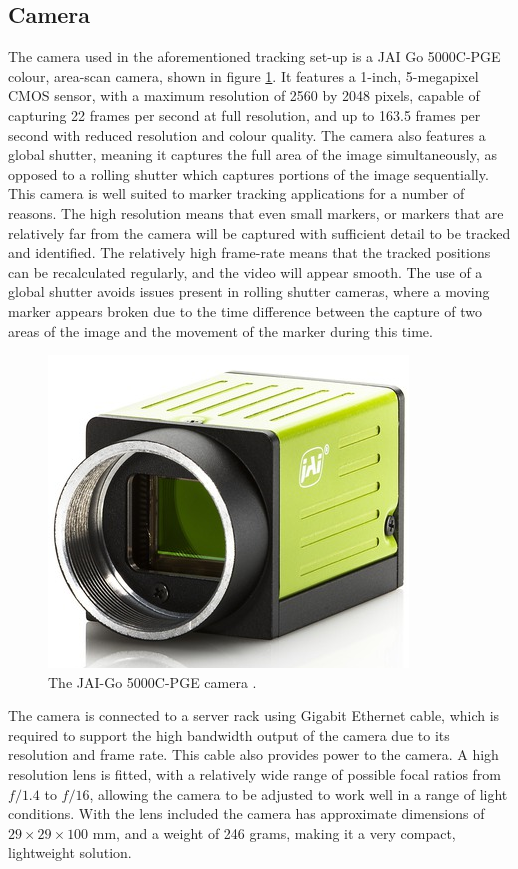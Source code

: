 \subsection{Camera}
The camera used in the aforementioned tracking set-up is a JAI Go 5000C-PGE colour, area-scan camera, shown in figure \ref{fig:Camera}. It features a 1-inch, 5-megapixel CMOS sensor, with a maximum resolution of 2560 by 2048 pixels, capable of capturing 22 frames per second at full resolution, and up to 163.5 frames per second with reduced resolution and colour quality. The camera also features a global shutter, meaning it captures the full area of the image simultaneously, as opposed to a rolling shutter which captures portions of the image sequentially. This camera is well suited to marker tracking applications for a number of reasons. The high resolution means that even small markers, or markers that are relatively far from the camera will be captured with sufficient detail to be tracked and identified. The relatively high frame-rate means that the tracked positions can be recalculated regularly, and the video will appear smooth. The use of a global shutter avoids issues present in rolling shutter cameras, where a moving marker appears broken due to the time difference between the capture of two areas of the image and the movement of the marker during this time.

\begin{figure}
	\centering
	\includegraphics[scale=0.8]{Figures/Camera.png}
	\decoRule
	\caption[JAI-Go Camera]{The JAI-Go 5000C-PGE camera \cite{JAIGoCamera}.}
	\label{fig:Camera}
\end{figure}

The camera is connected to a server rack using Gigabit Ethernet cable, which is required to support the high bandwidth output of the camera due to its resolution and frame rate. This cable also provides power to the camera. A high resolution lens is fitted, with a relatively wide range of possible focal ratios from $f/1.4$ to $f/16$, allowing the camera to be adjusted to work well in a range of light conditions. With the lens included the camera has approximate dimensions of $29 \times 29 \times 100$ mm, and a weight of 246 grams, making it a very compact, lightweight solution.

